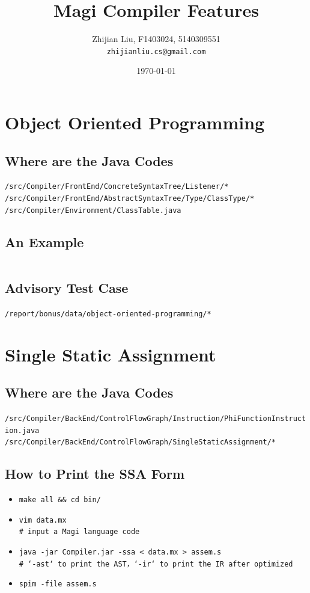 \documentclass[a4paper]{article}
\begin{document}
\title{Magi Compiler Features}
\author{
	Zhijian Liu, F1403024, 5140309551\\
	\texttt{zhijianliu.cs@gmail.com}
}
\date{\today}

\maketitle

\section{Object Oriented Programming}
\subsection{Where are the Java Codes}
\noindent
\texttt{/src/Compiler/FrontEnd/ConcreteSyntaxTree/Listener/*}\\
\texttt{/src/Compiler/FrontEnd/AbstractSyntaxTree/Type/ClassType/*}\\
\texttt{/src/Compiler/Environment/ClassTable.java}
\subsection{An Example}
\inputminted[mathescape]{java}{code/object-oriented-programming/oop-2.mx}
\subsection{Advisory Test Case}
\noindent
\texttt{/report/bonus/data/object-oriented-programming/*}

\section{Single Static Assignment}
\subsection{Where are the Java Codes}
\noindent
\texttt{/src/Compiler/BackEnd/ControlFlowGraph/Instruction/PhiFunctionInstruction.java}\\
\texttt{/src/Compiler/BackEnd/ControlFlowGraph/SingleStaticAssignment/*}
\subsection{How to Print the SSA Form}
\begin{itemize}
\item
\texttt{make all \&\& cd bin/}
\item
\texttt{vim data.mx}\\
\texttt{\# input a Magi language code}
\item
\texttt{java -jar Compiler.jar -ssa < data.mx > assem.s}\\
\texttt{\# `-ast` to print the AST，`-ir` to print the IR after optimized}
\item
\texttt{spim -file assem.s}
\end{itemize}
\end{document}

